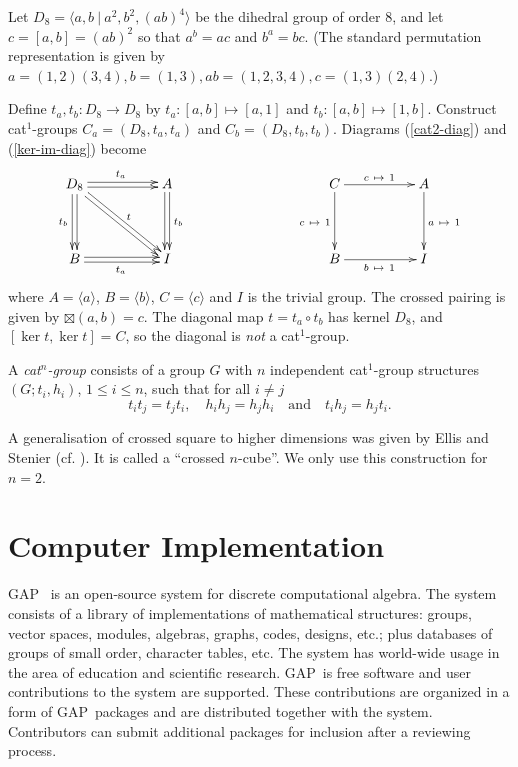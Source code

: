 \documentclass{ws-ijac}
\newcommand{\GAP}      {{\sf GAP}}
\newcommand{\bt}      {\boxtimes}
\begin{document}
\begin{example} \label{ex-d8} 
Let $D_8 = \langle a,b ~|~ a^2, b^2, (ab)^4 \rangle$ 
be the dihedral group of order $8$, 
and let $c=[a,b]=(ab)^2$ so that $a^b=ac$ and $b^a=bc$.  
(The standard permutation representation is given by 
$a=(1,2)(3,4), b=(1,3), ab=(1,2,3,4), c=(1,3)(2,4)$.) 

Define $t_a,t_b : D_8 \to D_8$ by $t_a : [a,b] \mapsto [a,1]$ 
and $t_b : [a,b] \mapsto [1,b]$. 
Construct cat$^1$-groups $C_a = (D_8,t_a,t_a)$ and $C_b = (D_8,t_b,t_b)$. 
Diagrams (\ref{cat2-diag}) and (\ref{ker-im-diag}) become 
\[
\xymatrix@R=40pt@C=50pt
{ D_8 \ar@<+0.4ex>[r]^{t_a} \ar@<-0.4ex>[r] 
    \ar@<-0.4ex>[d]_{t_b} \ar@<+0.4ex>[d] 
    \ar@<-0.4ex>[rd]^{\ t} \ar@<+0.4ex>[rd] 
	& A \ar@<+0.4ex>[d]^{t_b} \ar@<-0.4ex>[d] 
	   &  & C \ar[r]^{c\ \mapsto\ 1} \ar[d]_{c\ \mapsto\ 1}  
	         & A \ar[d]^{a\ \mapsto\ 1} \\
  B \ar@<-0.4ex>[r]_{t_a} \ar@<+0.4ex>[r] 
	& I 
	   &  & B \ar[r]_{b\ \mapsto\ 1}  
	         & I }
\] 
where $A = \langle a \rangle$, $B = \langle b \rangle$, $C = \langle c \rangle$ 
and $I$ is the trivial group. 
The crossed pairing is given by $\bt(a,b)=c$. 
The diagonal map $t = t_a \circ t_b$ has kernel $D_8$, 
and $[\ker t,\ker t] = C$, so the diagonal is \emph{not} a cat$^1$-group. 
\end{example} 

\begin{definition}
A \emph{cat$^{n}$-group} consists of a group $G$ 
with $n$ independent cat$^{1}$-group structures $(G;t_{i},h_{i})$, 
$1 \leq i \leq n$, such that for all $i \ne j$ 
\[
t_{i}t_{j} = t_{j}t_{i}, \quad 
h_{i}h_{j} = h_{j}h_{i} \quad \mbox{and} \quad 
t_{i}h_{j} = h_{j}t_{i}. 
\]
\end{definition}

A generalisation of crossed square to higher dimensions was given by Ellis
and Stenier (cf. \cite{ellis-stenier}). 
It is called a \textquotedblleft crossed $n$-cube\textquotedblright. 
We only use this construction for $n=2$.


\section{Computer Implementation}

\GAP\ \cite{gap} is an open-source system for discrete computational
algebra. The system consists of a library of implementations of mathematical
structures: groups, vector spaces, modules, algebras, graphs, codes,
designs, etc.; plus databases of groups of small order, character tables, etc. 
The system has world-wide usage in the area of education and scientific research. 
\GAP\ is free software and user contributions to the system are supported. 
These contributions are organized in a form of \GAP\ packages 
and are distributed together with the system.  Contributors can
submit additional packages for inclusion after a reviewing process.
\end{document}
